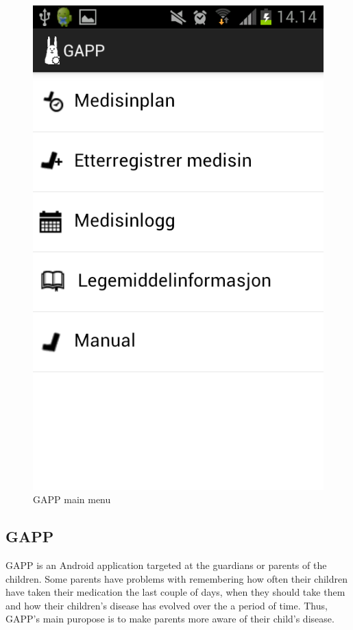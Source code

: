 \begin{figure}[H]
\begin{minipage}[b]{0.4\linewidth}
		\includegraphics[width=0.20\paperwidth]{Pictures/app-screenshots/gapp_main_menu.png}
		\caption{GAPP main menu}
		\label{fig:gapp-main-menu1}
	\end{minipage}
\end{figure}


\subsection{GAPP}
\label{sec:description-gapp}
GAPP is an Android application targeted at the guardians or parents of the children. 
Some parents have problems with remembering how often their children have taken their medication the last couple of days, when they should take them and how their children's disease has evolved over the a period of time. Thus, GAPP's main puropose is to make parents more aware of their child's disease.   


